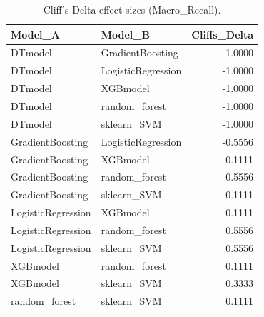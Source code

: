\begin{table}[t]
\centering
\begin{tabular}{llr}
\toprule
Model_A & Model_B & Cliffs_Delta \\
\midrule
DTmodel & GradientBoosting & -1.0000 \\
DTmodel & LogisticRegression & -1.0000 \\
DTmodel & XGBmodel & -1.0000 \\
DTmodel & random_forest & -1.0000 \\
DTmodel & sklearn_SVM & -1.0000 \\
GradientBoosting & LogisticRegression & -0.5556 \\
GradientBoosting & XGBmodel & -0.1111 \\
GradientBoosting & random_forest & -0.5556 \\
GradientBoosting & sklearn_SVM & 0.1111 \\
LogisticRegression & XGBmodel & 0.1111 \\
LogisticRegression & random_forest & 0.5556 \\
LogisticRegression & sklearn_SVM & 0.5556 \\
XGBmodel & random_forest & 0.1111 \\
XGBmodel & sklearn_SVM & 0.3333 \\
random_forest & sklearn_SVM & 0.1111 \\
\bottomrule
\end{tabular}
\caption{Cliff's Delta effect sizes (Macro_Recall).}
\label{tab:cliffs_Macro_Recall}
\end{table}